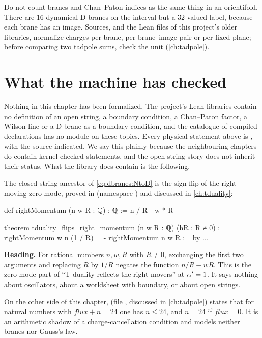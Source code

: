 \begin{pitfallbox}
Do not count branes and Chan--Paton indices as the same thing in an orientifold. There are $16$
dynamical D-branes on the interval but a $32$-valued label, because each brane has an image.
Sources, and the Lean files of this project's older libraries, normalize charges per brane, per
brane--image pair or per fixed plane; before comparing two tadpole sums, check the unit
(\cref{ch:tadpole}).
\end{pitfallbox}

\section{What the machine has checked}\label{sec:dbranes:lean}

Nothing in this chapter has been formalized. The project's Lean libraries contain no
definition of an open string, a boundary condition, a Chan--Paton factor, a Wilson line or a
D-brane as a boundary condition, and the catalogue of compiled declarations has no module on
these topics. Every physical statement above is \TL, with the source indicated. We say this
plainly because the neighbouring chapters do contain kernel-checked statements, and the
open-string story does not inherit their status. What the library does contain is the following.

\begin{leanbox}
The closed-string ancestor of \eqref{eq:dbranes:NtoD} is the sign flip of the right-moving zero
mode, proved in  (namespace
) and discussed in \cref{ch:tduality}:
\begin{leancode}
def rightMomentum (n w R : ℚ) : ℚ := n / R - w * R

theorem tduality_flips_right_momentum (n w R : ℚ) (hR : R ≠ 0) :
    rightMomentum w n (1 / R) = - rightMomentum n w R := by ...
\end{leancode}
\textbf{Reading.} For rational numbers $n,w,R$ with $R\ne0$, exchanging the first two arguments
and replacing $R$ by $1/R$ negates the function $n/R-wR$. This is the zero-mode part of
``T-duality reflects the right-movers'' at $\alpha'=1$. It says nothing about oscillators, about a
worldsheet with boundary, or about open strings.

On the other side of this chapter,  (file
, discussed in \cref{ch:tadpole}) states that for natural
numbers with $\mathit{flux}+n=24$ one has $n\le24$, and $n=24$ if $\mathit{flux}=0$. It is an
arithmetic shadow of a charge-cancellation condition and models neither branes nor Gauss's law.
\end{leanbox}

